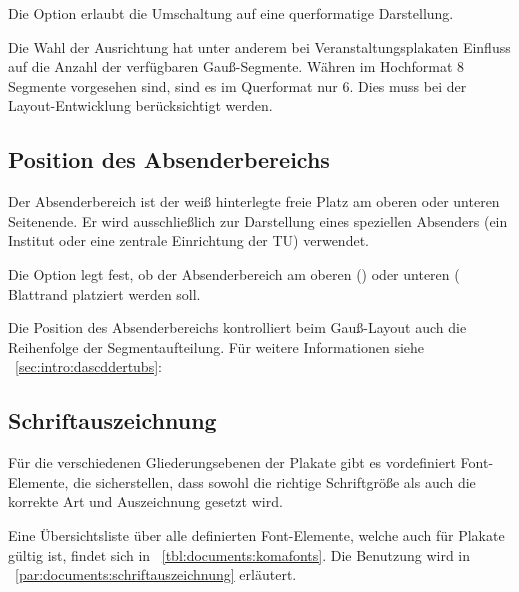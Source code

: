 \begin{Declaration}
\end{Declaration}

Die Option  erlaubt die Umschaltung auf eine
querformatige Darstellung.

\begin{hint}
Die Wahl der Ausrichtung hat unter anderem bei Veranstaltungsplakaten
Einfluss auf die Anzahl der verfügbaren Gauß-Segmente.
Währen im Hochformat 8 Segmente vorgesehen sind, sind es im Querformat nur
6. Dies muss bei der Layout-Entwicklung berücksichtigt werden.
\end{hint}

\subsection*{Position des Absenderbereichs}\label{sec:poster:sender}

Der Absenderbereich ist der weiß hinterlegte freie Platz am oberen oder
unteren Seitenende.
Er wird ausschließlich zur Darstellung eines speziellen Absenders
(ein Institut oder eine zentrale Einrichtung der TU) verwendet.

\begin{Declaration}
\end{Declaration}

Die Option  legt fest, ob der Absenderbereich am oberen ()
oder unteren ( Blattrand platziert werden soll.

Die Position des Absenderbereichs kontrolliert beim Gauß-Layout auch die
Reihenfolge der Segmentaufteilung.
Für weitere Informationen siehe \chaptername~\ref{sec:intro:dascddertubs}:

\subsection*{Schriftauszeichnung}\label{sec:poster:schriftauszeichnung}

Für die verschiedenen Gliederungsebenen der Plakate gibt es vordefiniert
Font-Elemente, die sicherstellen, dass sowohl die richtige Schriftgröße
als auch die korrekte Art und Auszeichnung gesetzt wird.

Eine Übersichtsliste über alle definierten Font-Elemente, welche auch
für Plakate gültig ist, findet sich in \tablename~\ref{tbl:documents:komafonts}.
Die Benutzung wird in \chaptername~\ref{par:documents:schriftauszeichnung} erläutert.

